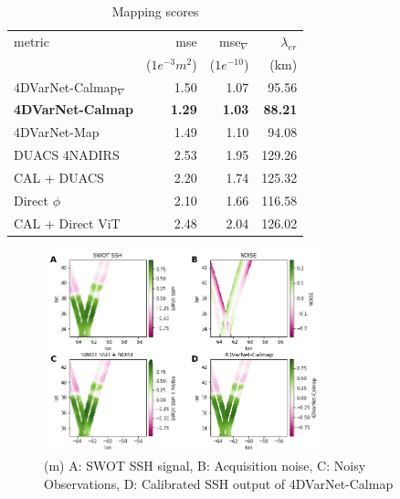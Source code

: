 \documentclass{article}
\begin{document}
\begin{table}
{\footnotesize
\begin{tabular}{lrrr}
\toprule
metric &       mse  &  mse${}_\nabla$  & $\lambda_{er}$ \\
	&        ($1e^{-3}m^2$) &   ($1e^{-10}$) & (km) \\
\midrule
4DVarNet-Calmap${}_{\nabla}$ &  1.50 &  1.07 & 95.56 \\
\textbf{4DVarNet-Calmap}      &  \textbf{1.29} &  \textbf{1.03} & \textbf{88.21} \\
4DVarNet-Map           &  1.49 &  1.10 & 94.08 \\
DUACS 4NADIRS          &  2.53 &  1.95 & 129.26 \\
CAL + DUACS            &  2.20 &  1.74 & 125.32 \\
Direct $\phi$          &  2.10 &  1.66 & 116.58 \\
CAL + Direct ViT   &  2.48 &  2.04 & 126.02 \\
\bottomrule
\end{tabular}}
\caption{Mapping scores}
\label{table:mapscores}
\end{table}

\begin{figure}[htb]
\begin{minipage}[b]{1.\linewidth}
  \centering
  \centerline{\includegraphics[width=8.0cm]{figs/square_obs_grid_sep_scale.png}}
	\caption{(m) A: SWOT SSH signal, B: Acquisition noise, C: Noisy Observations, D: Calibrated SSH output of 4DVarNet-Calmap}
	\smallskip
\end{minipage}
%
\label{fig:res}
%

\end{figure}
\end{document}
